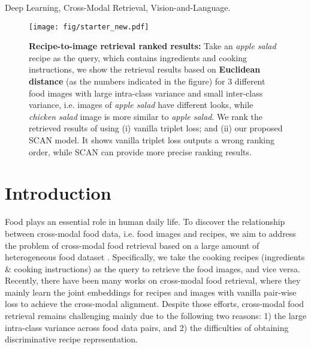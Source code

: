 \documentclass[journal]{IEEEtran}
\begin{document}
\begin{IEEEkeywords}
Deep Learning, Cross-Modal Retrieval, Vision-and-Language.
\end{IEEEkeywords}




\IEEEpeerreviewmaketitle



\begin{figure*}[htb]
\begin{center}
\texttt{[image: fig/starter\_new.pdf]}
\end{center}
   \caption{\textbf{Recipe-to-image retrieval ranked results:} Take an \emph{apple salad} recipe as the query, which contains ingredients and cooking instructions, we show the retrieval results based on \textbf{Euclidean distance} (as the numbers indicated in the figure) for 3 different food images with large intra-class variance and small inter-class variance, i.e. images of \emph{apple salad} have different looks, while \emph{chicken salad} image is more similar to \emph{apple salad}. We rank the retrieved results of using (i) vanilla triplet loss; and (ii) our proposed SCAN model. It shows vanilla triplet loss outputs a wrong ranking order, while SCAN can provide more precise ranking results.}
\label{fig:motivation}
\end{figure*}

\section{Introduction}
Food plays an essential role in human daily life. To discover the relationship between cross-modal food data, i.e. food images and recipes, we aim to address the problem of cross-modal food retrieval based on a large amount of heterogeneous food dataset \cite{salvador2017learning}. Specifically, we take the cooking recipes (ingredients \& cooking instructions) as the query to retrieve the food images, and vice versa.
Recently, there have been many works \cite{salvador2017learning,carvalho2018cross,wang2019learning} on cross-modal food retrieval, where they mainly learn the joint embeddings for recipes and images with vanilla pair-wise loss to achieve the cross-modal alignment. Despite those efforts, cross-modal food retrieval remains challenging mainly due to the following two reasons: 1) the large intra-class variance across food data pairs, and 2) the difficulties of obtaining discriminative recipe representation. 
\end{document}
